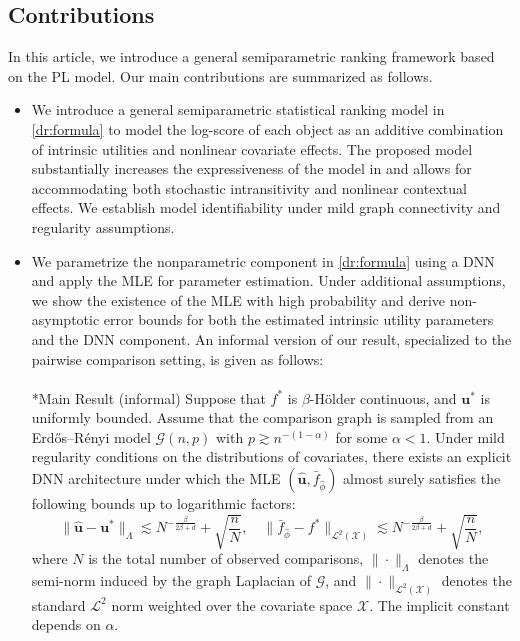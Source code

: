 \documentclass[
  12pt]{article}
\makeatletter
\let\oldparagraph\paragraph
\renewcommand{\paragraph}{
    \@ifstar
      \xxxParagraphStar
      \xxxParagraphNoStar
  }
\newcommand{\xxxParagraphStar}[1]{\oldparagraph*{#1}\mbox{}}
\newcommand{\xxxParagraphNoStar}[1]{\oldparagraph{#1}\mbox{}}
\makeatother
\begin{document}
\subsection{Contributions}

In this article, we introduce a general semiparametric ranking framework based on the PL model. Our main contributions are summarized as follows.
\begin{itemize}
\item We introduce a general semiparametric statistical ranking model in \eqref{dr:formula} to model the log-score of each object as an additive combination of intrinsic utilities and nonlinear covariate effects. The proposed model substantially increases the expressiveness of the model in \cite{dong2025statistical} and allows for accommodating both stochastic intransitivity and nonlinear contextual effects. We establish model identifiability under mild graph connectivity and regularity assumptions. 

\item We parametrize the nonparametric component in \eqref{dr:formula} using a DNN and apply the MLE for parameter estimation. Under additional assumptions, we show the existence of the MLE with high probability and derive non-asymptotic error bounds for both the estimated intrinsic utility parameters and the DNN component. An informal version of our result, specialized to the pairwise comparison setting, is given as follows: 
\paragraph*{Main Result (informal)}
Suppose that $f^*$ is $\beta$-Hölder continuous, and $\bm u^*$ is uniformly bounded. Assume that the comparison graph is sampled from an Erdős--R\'enyi model $\mathcal G(n, p)$ with $p\gtrsim n^{-(1-\alpha)}$ for some $\alpha<1$. Under mild regularity conditions on the distributions of covariates, there exists an explicit DNN architecture under which the MLE $(\widehat{\boldsymbol{u}},\bar{f}_{\widehat{\phi}})$ almost surely satisfies the following bounds 
up to logarithmic factors:
\begin{equation*}
    \|\widehat{\boldsymbol{u}}-\boldsymbol{u}^*\|_{\Lambda} \lesssim N^{-\frac{\beta}{2\beta +d}} + \sqrt{\frac{n}{N}}, \quad \|\bar{f}_{\widehat{\phi}}-f^*\|_{\mathcal{L}^2(\mathcal{X})} \lesssim N^{-\frac{\beta}{2\beta +d}}  + \sqrt{\frac{n}{N}},
    \end{equation*}
    where $N$ is the total number of observed comparisons, $\|\cdot\|_{\Lambda}$ denotes the semi-norm induced by the graph Laplacian of $\mathcal G$, and $\|\cdot\|_{\mathcal{L}^2(\mathcal{X})}$ denotes the standard $\mathcal{L}^2$ norm weighted over the covariate space $\mathcal{X}$. The implicit constant depends on $\alpha$.  
\end{itemize}
\end{document}

